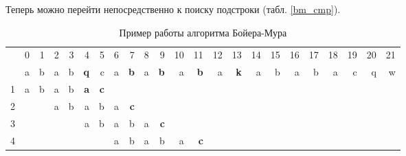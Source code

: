 \documentclass[a4paper,12pt]{article}
\begin{document}
Теперь можно перейти непосредственно к поиску подстроки (табл. \ref{bm_cmp}).

\begin{table} [h!]
	\begin{center}
		\caption{Пример работы алгоритма Бойера-Мура}
		\begin{tabular}{|rrrrrrrrrrrrrrrrrrrrrrr|}
			\hline
			&          0 &          1 &          2 &          3 &          4 &          5 &          6 &          7 &          8 &          9 &         10 &         11 &         12 &         13 &         14 &         15 &         16 &         17 &         18 &         19 &         20 &         21 \\
			
			&          a &          b &          a &          b &    {\bf q} &          c &          a &    {\bf b} &          a &    {\bf b} &          a &    {\bf b} &          a &    {\bf k} &          a &          b &          a &          b &          a &          c &          q &          w \\
			
			1 &          a &          b &          a &          b &    {\bf a} &    {\bf c} &            &            &            &            &            &            &            &            &            &            &            &            &            &            &            &            \\
			
			2 &            &            &          a &          b &          a &          b &          a &    {\bf c} &            &            &            &            &            &            &            &            &            &            &            &            &            &            \\
			
			3 &            &            &            &            &          a &          b &          a &          b &          a &    {\bf c} &            &            &            &            &            &            &            &            &            &            &            &            \\
			
			4 &            &            &            &            &            &            &          a &          b &          a &          b &          a &    {\bf c} &            &            &            &            &            &            &            &            &            &            \\
			

\end{tabular}
\end{center}
\end{table}
\end{document}
